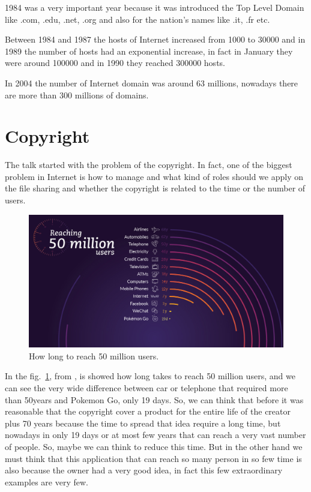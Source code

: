 \documentclass{article}
\begin{document}
    1984 was a very important year because it was introduced the Top Level Domain like .com, .edu, .net, .org and also for the nation's names like .it, .fr etc.
    
    Between 1984 and 1987 the hosts of Internet increased from 1000 to 30000 and in 1989 the number of hosts had an exponential increase, in fact in January they were around 100000 and in 1990 they reached 300000 hosts.
    
    In 2004 the number of Internet domain was around 63 millions, nowadays there are more than 300 millions of domains.
    
\section{Copyright \textcopyright}
    The talk started with the problem of the copyright. In fact, one of the biggest problem in Internet is how to manage and what kind of roles should we apply on the file sharing and whether the copyright is related to the time or the number of users.
    
    \begin{figure}
        \centering
        \includegraphics[width=\textwidth]{tech-adoption-time-prev.jpg}
        \caption{How long to reach 50 million users.}
        \label{fig:50milUser}
    \end{figure}

    In the fig.~\ref{fig:50milUser}, from \cite{50milUsers}, is showed how long takes to reach 50 million users, and we can see the very wide difference between car or telephone that required more than 50years and Pokemon Go, only 19 days. So, we can think that before it was reasonable that the copyright cover a product for the entire life of the creator plus 70 years \cite{CopyrightHowLong} because the time to spread that idea require a long time, but nowadays in only 19 days or at most few years that can reach a very vast number of people. So, maybe we can think to reduce this time. But in the other hand we must think that this application that can reach so many person in so few time is also because the owner had a very good idea, in fact this few extraordinary examples are very few.
    
\end{document}
